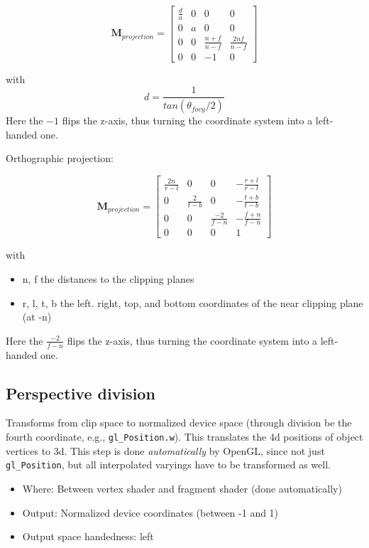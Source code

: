 \documentclass{scrartcl}
\begin{document}
        \[
        \mathbf{M}_{projection} =
        \begin{bmatrix}
            \frac{d}{a} & 0 & 0 & 0 \\
            0 & a & 0 & 0 \\
            0 & 0 & \frac{n+f}{n-f} & \frac{2nf}{n-f} \\
            0 & 0 & -1 & 0
        \end{bmatrix}
        \]

        with
        \[
        d = \frac{1}{tan (\theta_{fovy}/2)}
        \]
        Here the $-1$ flips the z-axis, thus turning the coordinate system into a left-handed one.

        Orthographic projection:

        \[
        \mathbf{M}_{projection} =
        \begin{bmatrix}
            \frac{2n}{r-l} & 0 & 0 & -\frac{r+l}{r-l} \\
            0 & \frac{2}{t-b} & 0 & -\frac{t+b}{t-b} \\
            0 & 0 & \frac{-2}{f-n} & -\frac{f+n}{f-n} \\
            0 & 0 & 0 & 1
        \end{bmatrix}
        \]

        with
        \begin{itemize}
            \item n, f the distances to the clipping planes
            \item r, l, t, b the left. right, top, and bottom coordinates of the near clipping plane (at -n)
        \end{itemize}

        Here the $\frac{-2}{f-n} $ flips the z-axis, thus turning the coordinate system into a left-handed one.

    \subsection{Perspective division}

    Transforms from clip space to normalized device space (through division be the fourth coordinate, e.g., \texttt{gl\_Position.w}). This translates the 4d positions of object vertices to 3d.
    This step is done \textit{automatically} by OpenGL, since not just \texttt{gl\_Position}, but all interpolated varyings have to be transformed as well.

    \begin{itemize}
        \item Where: Between vertex shader and fragment shader (done automatically)
        \item Output: Normalized device coordinates (between -1 and 1)
        \item Output space handedness: left
    \end{itemize}
\end{document}
